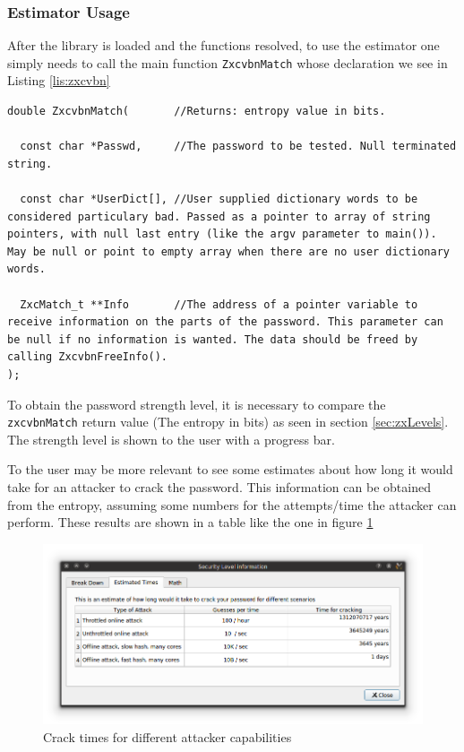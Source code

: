 \subsubsection{Estimator Usage}

After the library is loaded and the functions resolved, to use the estimator one simply needs to call the main function \texttt{ZxcvbnMatch} whose declaration we see in Listing \ref{lis:zxcvbn} 

\begin{lstlisting}[style=customc, float=htb, caption={ZxcvbnMatch function declaration}, label = {lis:zxcvbn}]
double ZxcvbnMatch(       //Returns: entropy value in bits.
 
  const char *Passwd,     //The password to be tested. Null terminated string. 
  
  const char *UserDict[], //User supplied dictionary words to be considered particulary bad. Passed as a pointer to array of string pointers, with null last entry (like the argv parameter to main()). May be null or point to empty array when there are no user dictionary words. 
  
  ZxcMatch_t **Info       //The address of a pointer variable to receive information on the parts of the password. This parameter can be null if no information is wanted. The data should be freed by calling ZxcvbnFreeInfo().
);
\end{lstlisting}

To obtain the password strength level, it is necessary to compare the \texttt{zxcvbnMatch} return value (The entropy in bits) as seen in section \ref{sec:zxLevels}. The strength level is shown to the user with a progress bar.

To the user may be more relevant to see some estimates about how long it would take for an attacker to crack the password. This information can be obtained from the entropy, assuming some numbers for the attempts/time the attacker can perform. These results are shown in a table like the one in figure \ref{fig:zxcvbnTimes}
\begin{figure}[htb]
  \centering
  \captionsetup{justification=centering}
  \includegraphics[width=1\columnwidth]{chapters/figures/development/zxcvbnTimes}
  \caption{Crack times for different attacker capabilities}
  \label{fig:zxcvbnTimes}
\end{figure}

